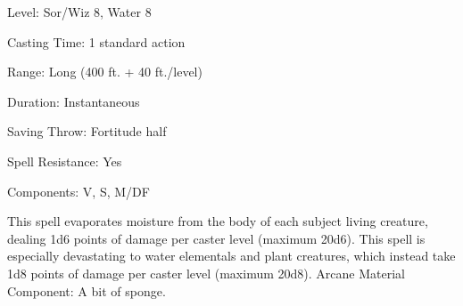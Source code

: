
\begin{description*}
\item[Level:] Sor/Wiz 8, Water 8
\item[Casting Time:] 1 standard action
\item[Range:] Long (400 ft. + 40 ft./level)
\item[Duration:] Instantaneous
\item[Saving Throw:] Fortitude half
\item[Spell Resistance:] Yes
\item[Components:] V, S, M/DF
\end{description*}

This spell evaporates moisture from the body of each subject living creature, dealing
1d6 points of damage per caster level (maximum 20d6). This spell is especially
devastating to water elementals and plant creatures, which instead take 1d8 points
of damage per caster level (maximum 20d8).
Arcane Material Component: A bit of sponge.